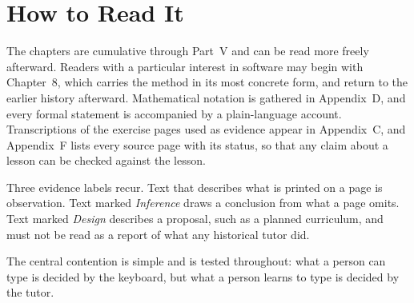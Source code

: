 \section*{How to Read It}

The chapters are cumulative through Part~V and can be read more freely afterward. Readers with a particular interest in software may begin with Chapter~8, which carries the method in its most concrete form, and return to the earlier history afterward. Mathematical notation is gathered in Appendix~D, and every formal statement is accompanied by a plain-language account. Transcriptions of the exercise pages used as evidence appear in Appendix~C, and Appendix~F lists every source page with its status, so that any claim about a lesson can be checked against the lesson.

Three evidence labels recur. Text that describes what is printed on a page is observation. Text marked \emph{Inference} draws a conclusion from what a page omits. Text marked \emph{Design} describes a proposal, such as a planned curriculum, and must not be read as a report of what any historical tutor did.

The central contention is simple and is tested throughout: what a person can type is decided by the keyboard, but what a person learns to type is decided by the tutor.
